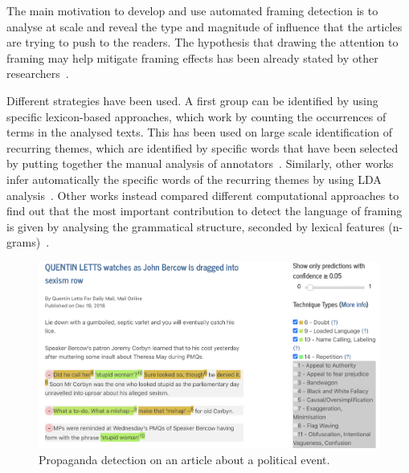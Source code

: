 The main motivation to develop and use automated framing detection is to analyse at scale and reveal the type and magnitude of influence that the articles are trying to push to the readers. The hypothesis that drawing the attention to framing may help mitigate framing effects has been already stated by other researchers~\cite{baumer2015testing}.


Different strategies have been used.
A first group can be identified by using specific lexicon-based approaches, which work by counting the occurrences of terms in the analysed texts.
This has been used on large scale identification of recurring themes, which are identified by specific words that have been selected by putting together the manual analysis of annotators~\cite{}.
Similarly, other works infer automatically the specific words of the recurring themes by using LDA analysis~\cite{tsur2015frame}.
Other works instead compared different computational approaches to find out that the most important contribution to detect the language of framing is given by analysing the grammatical structure, seconded by lexical features (n-grams)~\cite{baumer2015testing}.


\begin{figure}[!htb]
    \centering
    \includegraphics[width=\linewidth]{figures/brexit_propaganda.png}
    \caption{Propaganda detection on an article about a political event.}
    \label{fig:brexit_propaganda}
\end{figure}

